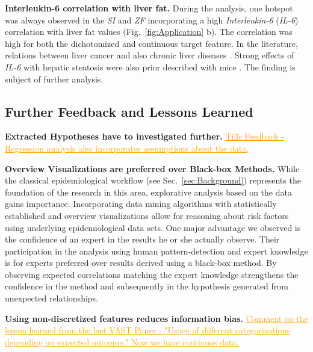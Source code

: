 \documentclass[journal]{style/vgtc} 			          %
\newcommand{\com}[1]{\textcolor{orange}{\uline{#1}}}
\begin{document}
\textbf{Interleukin-6 correlation with liver fat.}
During the analysis, one hotspot was always observed in the \emph{SI} and \emph{ZF} incorporating a high \emph{Interleukin-6} (\emph{IL-6}) correlation with liver fat values (Fig.~\ref{fig:Application} b).
The correlation was high for both the dichotomized and continuous target feature.
In the literature, relations between liver cancer \cite{He2013} and also chronic liver diseases \cite{Streetz2003}.
Strong effects of \emph{IL-6} with hepatic steatosis were also prior described with mice \cite{Hong2004}.
The finding is subject of further analysis.
\subsection{Further Feedback and Lessons Learned} \label{Lessons Learned}
\textbf{Extracted Hypotheses have to investigated further.}
\com{Tills Feedback - Regression analysis also incorporates assumptions about the data, }

\textbf{Overview Visualizations are preferred over Black-box Methods.}
While the classical epidemiological workflow (see Sec.~\ref{sec:Background}) represents the foundation of the research in this area, explorative analysis based on the data gains importance.
Incorporating data mining algorithms with statistically established and overview visualizations allow for reasoning about risk factors using underlying epidemiological data sets.
One major advantage we observed is the confidence of an expert in the results he or she actually observe.
Their participation in the analysis using human pattern-detection and expert knowledge is for experts preferred over results derived using a black-box method.
By observing expected correlations matching the expert knowledge strengthens the confidence in the method and subsequently in the hypothesis generated from unexpected relationships.

\textbf{Using non-discretized features reduces information bias.}
\com{Comment on the lesson learned from the last VAST Paper - "Usage of different categorizations depending on expected outcome." Now we have continuos data.}
\end{document}
